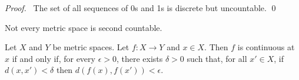 \begin{proof}
  \pf\ The set of all sequences of 0s and 1s is discrete but uncountable. \qed
\end{proof}

\begin{cor}
  Not every metric space is second countable.
\end{cor}

\begin{thm}
  \label{thm:topology:metric:continuous}
  Let $X$ and $Y$ be metric spaces. Let $f : X \rightarrow Y$ and $x \in X$.
  Then $f$ is continuous at $x$ if and only if, for every $\epsilon > 0$,
  there
  exists $\delta > 0$ such that, for all $x' \in X$, if $d(x, x') < \delta$
  then
  $d(f(x), f(x')) < \epsilon$.
\end{thm}

